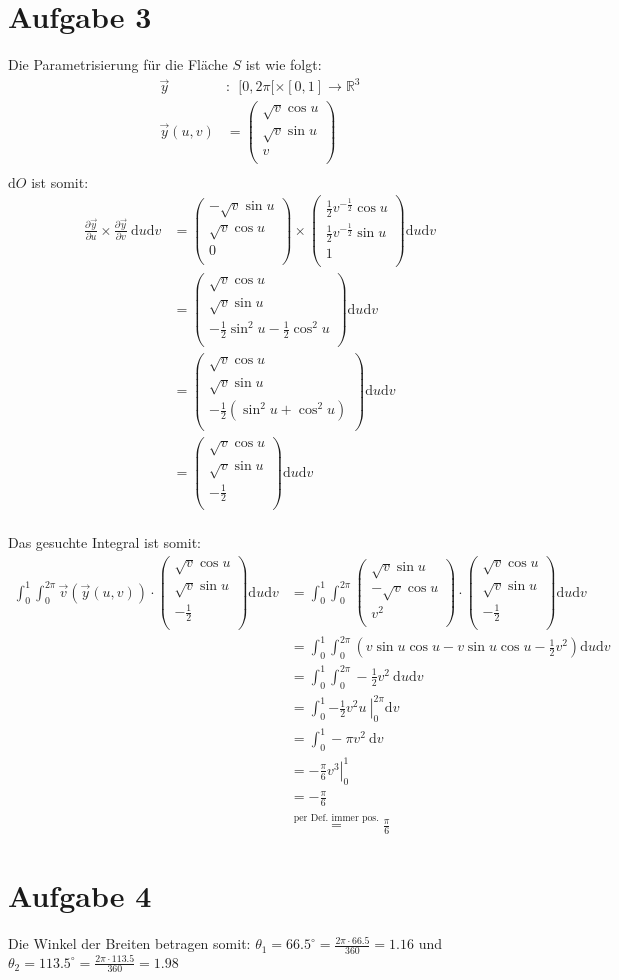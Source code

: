 \documentclass[10pt,a4paper,parskip=half]{scrartcl}
\newcommand{\vecthree}[3]{\begin{pmatrix}#1\\#2\\#3\\\end {pmatrix}}
\begin{document}
\section*{Aufgabe 3}
Die Parametrisierung für die Fläche $S$ ist wie folgt:
\begin{align*}
\vec y&:~~ [0,2\pi[ \times [0,1] \to \mathbb{R}^3\\
\vec y(u,v) &= \vecthree{\sqrt v\cos u}{\sqrt v\sin u}{v} \\
\end{align*}
$\mathrm d O$ ist somit:
\begin{align*}
\frac{\partial \vec y}{\partial u} \times \frac{\partial \vec y}{\partial v} ~ \mathrm d u \mathrm d v &= \vecthree{-\sqrt{v}\sin u}{\sqrt{v}\cos u}{0} \times \vecthree{\frac 1 2 v^{-\frac 1 2}\cos u}{\frac 1 2 v^{-\frac 1 2} \sin u}{1} \mathrm d u \mathrm d v\\
&= \vecthree{\sqrt{v}\cos u}{\sqrt{v}\sin u}{-\frac 1 2 \sin^2 u - \frac 1 2 \cos^2 u} \mathrm d u \mathrm d v\\
&= \vecthree{\sqrt{v}\cos u}{\sqrt{v}\sin u}{-\frac 1 2 (\sin^2 u + \cos^2 u)} \mathrm d u \mathrm d v\\
&= \vecthree{\sqrt{v}\cos u}{\sqrt{v}\sin u}{-\frac 1 2} \mathrm d u \mathrm d v\\
\end{align*}

Das gesuchte Integral ist somit:
\begin{align*}
\int_0^1 \int_0^{2\pi} \vec v(\vec y(u,v)) \cdot \vecthree{\sqrt{v}\cos u}{\sqrt{v}\sin u}{-\frac 1 2} \mathrm d u \mathrm d v &= \int_0^1 \int_0^{2\pi} \vecthree{\sqrt v\sin u}{-\sqrt v\cos u}{v^2} \cdot \vecthree{\sqrt{v}\cos u}{\sqrt{v}\sin u}{-\frac 1 2} \mathrm d u \mathrm d v \\
&= \int_0^1 \int_0^{2\pi} \left(v \sin u \cos u - v \sin u \cos u - \frac 1 2 v^2\right) \mathrm d u \mathrm d v \\
&= \int_0^1 \int_0^{2\pi} - \frac 1 2 v^2~ \mathrm d u \mathrm d v \\
&= \int_0^1 \left. - \frac 1 2 v^2 u~ \right|_0^{2\pi} \mathrm d v \\
&= \int_0^1 - \pi v^2 ~ \mathrm d v \\
&= \left. - \frac \pi 6 v^3 \right|_0^1 \\
&= -\frac \pi 6 \\
&\overset{\text{per Def. immer pos.}}{=} \frac \pi 6
\end{align*}
\section*{Aufgabe 4}
Die Winkel der Breiten betragen somit: $\theta_1 = 66.5^{\circ} = \frac{2\pi \cdot 66.5}{360} = 1.16$ und $\theta_2 = 113.5^{\circ} = \frac{2\pi \cdot 113.5}{360} = 1.98$
\end{document}
